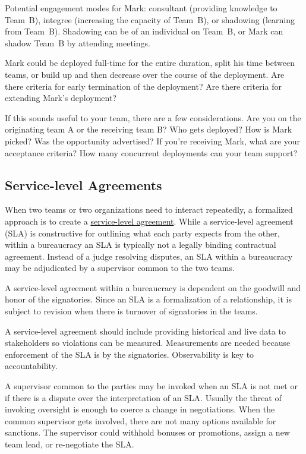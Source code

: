 Potential engagement modes for Mark: consultant (providing knowledge to Team~B), integree (increasing the capacity of Team~B), or shadowing (learning from Team~B). Shadowing can be of an individual on Team~B, or Mark can shadow Team~B by attending meetings. 


Mark could be deployed full-time for the entire duration, split his time between teams, or build up and then decrease over the course of the deployment.
Are there criteria for early termination of the deployment? Are there criteria for extending Mark's deployment?

If this sounds useful to your team, there are a few considerations. Are you on the originating team A or the receiving team B? Who gets deployed? How is Mark picked? Was the opportunity advertised? If you're receiving Mark, what are your acceptance criteria? How many concurrent deployments can your team support?


\subsection*{Service-level Agreements\label{sec:sla}}

When two teams or two organizations need to interact repeatedly, a formalized approach is to create a \href{https://en.wikipedia.org/wiki/Service-level_agreement}{service-level agreement}. 
While a service-level agreement (SLA) is constructive for outlining what each party expects from the other, within a bureaucracy an SLA is typically not a legally binding contractual agreement. Instead of a judge resolving disputes, an SLA within a bureaucracy may be adjudicated by a supervisor common to the two teams.

A service-level agreement within a bureaucracy is dependent on the goodwill and honor of the signatories. Since an SLA is a formalization of a relationship, it is subject to revision when there is turnover of signatories in the teams. 

A service-level agreement should include providing historical and live data to stakeholders so violations can be measured. Measurements are needed because enforcement of the SLA is by the signatories. Observability is key to accountability. 

A supervisor common to the parties may be invoked when an SLA is not met or if there is a dispute over the interpretation of an SLA. Usually the threat of invoking oversight is enough to coerce a change in negotiations. 
When the common supervisor gets involved, there are not many options available for sanctions. The supervisor could withhold bonuses or promotions,  assign a new team lead, or re-negotiate the SLA. 


